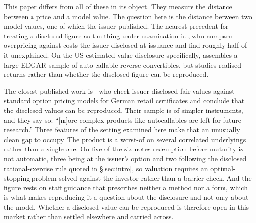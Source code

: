 This paper differs from all of these in its object. They measure the distance
between a price and a model value. The question here is the distance between
two model values, one of which the issuer published. The nearest precedent for
treating a disclosed figure as the thing under examination is
\citet{Jorgensen2011}, who compare overpricing against costs the issuer
disclosed at issuance and find roughly half of it unexplained. On the US
estimated-value disclosure specifically, \citet{Lai2022} assembles a large
EDGAR sample of auto-callable reverse convertibles, but studies realised
returns rather than whether the disclosed figure can be reproduced.

The closest published work is \citet{Bauer2020}, who check issuer-disclosed
fair values against standard option pricing models for German retail
certificates and conclude that the disclosed values can be reproduced. Their
sample is of simpler instruments, and they say so: ``[m]ore complex products
like autocallables are left for future research.'' Three features of the setting
examined here make that an unusually clean gap to occupy. The product is a
worst-of on several correlated underlyings rather than a single one. On five of
the six notes redemption before maturity is not automatic, three being at the
issuer's option and two following the disclosed rational-exercise rule quoted
in \S\ref{sec:intro}, so valuation requires an optimal-stopping problem solved
against the investor rather than a barrier check. And the figure rests on staff
guidance that prescribes neither a method nor a form, which is what makes
reproducing it a question about the disclosure and not only about the model.
Whether a disclosed value can be reproduced is therefore open in this market
rather than settled elsewhere and carried across.
